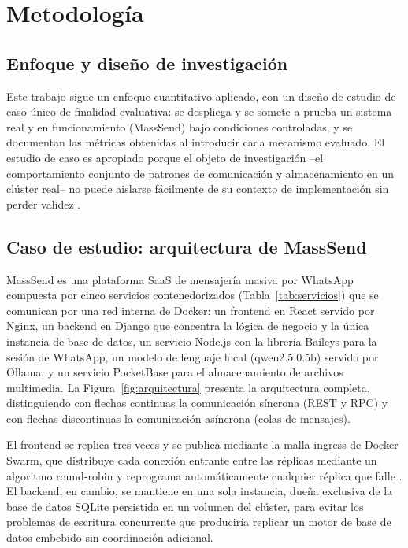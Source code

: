\section{Metodología}

\subsection{Enfoque y diseño de investigación}

Este trabajo sigue un enfoque cuantitativo aplicado, con un diseño de estudio
de caso único de finalidad evaluativa: se despliega y se somete a prueba un
sistema real y en funcionamiento (MassSend) bajo condiciones controladas, y
se documentan las métricas obtenidas al introducir cada mecanismo evaluado.
El estudio de caso es apropiado porque el objeto de investigación --el
comportamiento conjunto de patrones de comunicación y almacenamiento en un
clúster real-- no puede aislarse fácilmente de su contexto de implementación
sin perder validez \cite{ref4,ref5}.

\subsection{Caso de estudio: arquitectura de MassSend}

MassSend es una plataforma SaaS de mensajería masiva por WhatsApp compuesta
por cinco servicios contenedorizados (Tabla~\ref{tab:servicios}) que se
comunican por una red interna de Docker: un frontend en React servido por
Nginx, un backend en Django que concentra la lógica de negocio y la única
instancia de base de datos, un servicio Node.js con la librería Baileys para
la sesión de WhatsApp, un modelo de lenguaje local (qwen2.5:0.5b) servido por
Ollama, y un servicio PocketBase para el almacenamiento de archivos
multimedia. La Figura~\ref{fig:arquitectura} presenta la arquitectura
completa, distinguiendo con flechas continuas la comunicación síncrona (REST
y RPC) y con flechas discontinuas la comunicación asíncrona (colas de
mensajes).

El frontend se replica tres veces y se publica mediante la malla ingress de
Docker Swarm, que distribuye cada conexión entrante entre las réplicas
mediante un algoritmo round-robin y reprograma automáticamente cualquier
réplica que falle \cite{ref19,ref20}. El backend, en cambio, se mantiene en
una sola instancia, dueña exclusiva de la base de datos SQLite persistida en
un volumen del clúster, para evitar los problemas de escritura concurrente
que produciría replicar un motor de base de datos embebido sin coordinación
adicional.

